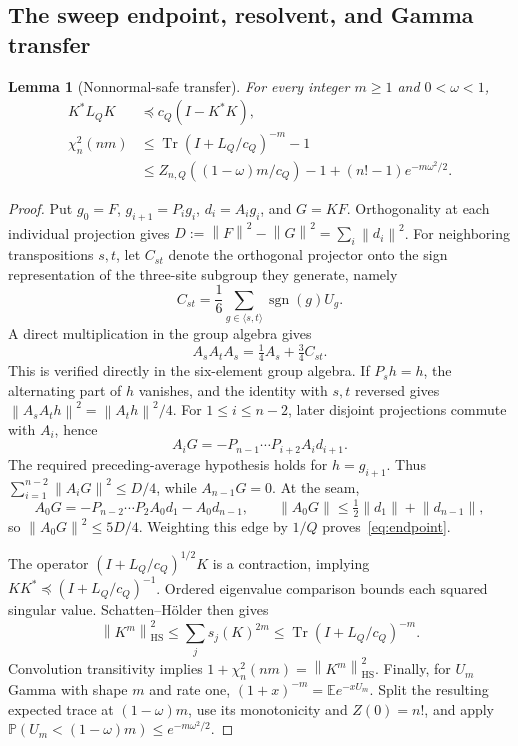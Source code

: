 \documentclass[11pt]{article}
\newtheorem{lemma}[theorem]{Lemma}
\theoremstyle{remark}
\newcommand{\E}{\mathbb E}
\newcommand{\Pp}{\mathbb P}
\newcommand{\Tr}{\operatorname{Tr}}
\newcommand{\HS}{\operatorname{HS}}
\newcommand{\norm}[1]{\left\lVert #1\right\rVert}
\begin{document}
\subsection{The sweep endpoint, resolvent, and Gamma transfer}
\begin{lemma}[Nonnormal-safe transfer]\label{lem:transfer}
For every integer $m\geq1$ and $0<\omega<1$,
\begin{align}
 K^*L_QK&\preceq c_Q(I-K^*K),\label{eq:endpoint}\\
 \chi_n^2(nm)&\leq\Tr(I+L_Q/c_Q)^{-m}-1\label{eq:resolvent}\\
 &\leq Z_{n,Q}((1-\omega)m/c_Q)-1+(n!-1)e^{-m\omega^2/2}.
 \label{eq:gamma}
\end{align}
\end{lemma}
\begin{proof}
Put $g_0=F$, $g_{i+1}=P_ig_i$, $d_i=A_ig_i$, and $G=KF$. Orthogonality at each individual projection gives
$D:=\norm F^2-\norm G^2=\sum_i\norm{d_i}^2$.
For neighboring transpositions $s,t$, let $C_{st}$ denote the orthogonal projector onto the sign representation of the three-site subgroup they generate, namely
\[
 C_{st}=\frac16\sum_{g\in\langle s,t\rangle}\operatorname{sgn}(g)U_g.
\]
A direct multiplication in the group algebra gives
\[
 A_sA_tA_s=\tfrac14 A_s+\tfrac34 C_{st}.
\]
This is verified directly in the six-element group algebra. If $P_sh=h$, the alternating part of $h$ vanishes, and the identity with $s,t$ reversed gives
$\norm{A_sA_th}^2=\norm{A_th}^2/4$.
For $1\leq i\leq n-2$, later disjoint projections commute with $A_i$, hence
\[
 A_iG=-P_{n-1}\cdots P_{i+2}A_id_{i+1}.
\]
The required preceding-average hypothesis holds for $h=g_{i+1}$. Thus
$\sum_{i=1}^{n-2}\norm{A_iG}^2\leq D/4$, while $A_{n-1}G=0$.
At the seam,
\[
 A_0G=-P_{n-2}\cdots P_2A_0d_1-A_0d_{n-1},\qquad
 \norm{A_0G}\leq\tfrac12\norm{d_1}+\norm{d_{n-1}},
\]
so $\norm{A_0G}^2\leq5D/4$. Weighting this edge by $1/Q$ proves~\eqref{eq:endpoint}.

The operator $(I+L_Q/c_Q)^{1/2}K$ is a contraction, implying
$KK^*\preceq(I+L_Q/c_Q)^{-1}$. Ordered eigenvalue comparison bounds each squared singular value. Schatten--H\"older then gives
\[
 \norm{K^m}_{\HS}^2\leq\sum_j s_j(K)^{2m}
 \leq\Tr(I+L_Q/c_Q)^{-m}.
\]
Convolution transitivity implies $1+\chi_n^2(nm)=\norm{K^m}_{\HS}^2$.
Finally, for $U_m$ Gamma with shape $m$ and rate one,
$(1+x)^{-m}=\E e^{-xU_m}$. Split the resulting expected trace at $(1-\omega)m$, use its monotonicity and $Z(0)=n!$, and apply
$\Pp(U_m<(1-\omega)m)\leq e^{-m\omega^2/2}$.
\end{proof}
\end{document}
